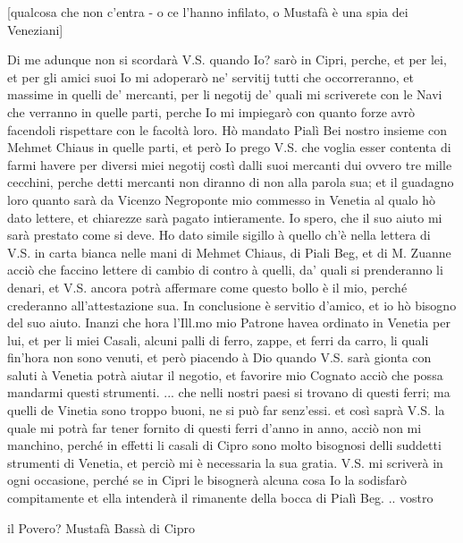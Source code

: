\startcifrato

[qualcosa che  non c'entra -  o ce l'hanno  infilato, o Mustafà  è una
  spia dei Veneziani]

\stopcifrato

Di me adunque non si scordarà  V.S. quando Io?  sarò in Cipri, perche,
et per lei,  et per gli amici suoi Io mi  adoperarò ne' servitij tutti
che occorreranno,  et massime in  quelli de' mercanti, per  li negotij
de'  quali mi scriverete  con le  Navi che  verranno in  quelle parti,
perche Io mi impiegarò con  quanto forze avrò facendoli rispettare con
le facoltà loro. Hò mandato Pialì Bei nostro insieme con Mehmet Chiaus
in quelle  parti, et però Io  prego V.S. che voglia  esser contenta di
farmi havere  per diversi miei  negotij costì dalli suoi  mercanti dui
ovvero tre  mille cecchini, perche  detti mercanti non diranno  di non
alla parola sua; et il guadagno loro quanto sarà da Vicenzo Negroponte
mio commesso  in Venetia al qualo  hò dato lettere,  et chiarezze sarà
pagato intieramente. Io spero, che  il suo aiuto mi sarà prestato come
si deve. Ho dato simile sigillo à quello ch'è nella lettera di V.S. in
carta  bianca  nelle  mani di  Mehmet  Chiaus,  di  Piali Beg,  et  di
M. Zuanne acciò che faccino lettere  di cambio di contro à quelli, da'
quali si  prenderanno li denari,  et V.S. ancora potrà  affermare come
questo  bollo è  il mio,  perché crederanno  all'attestazione  sua. In
conclusione è servitio d'amico, et io hò bisogno del suo aiuto. Inanzi
che hora  l'Ill.mo mio Patrone havea  ordinato in Venetia  per lui, et
per li miei  Casali, alcuni palli di ferro, zappe,  et ferri da carro,
li  quali fin'hora  non sono  venuti, et  però piacendo  à  Dio quando
V.S.  sarà gionta con  saluti à  Venetia potrà  aiutar il  negotio, et
favorire    mio   Cognato    acciò   che    possa    mandarmi   questi
strumenti. ... che  nelli nostri paesi si trovano  di questi ferri; ma
quelli de Vinetia sono troppo buoni,  ne si può far senz'essi. et così
saprà V.S. la quale mi potrà  far tener fornito di questi ferri d'anno
in anno, acciò  non mi manchino, perché in effetti  li casali di Cipro
sono molto bisognosi delli suddetti strumenti di Venetia, et perciò mi
è necessaria la sua gratia. V.S. mi scriverà in ogni occasione, perché
se in Cipri  le bisognerà alcuna cosa Io  la sodisfarò compitamente et
ella intenderà il rimanente della bocca di Pialì Beg. .. vostro

il Povero? Mustafà Bassà di Cipro
 
